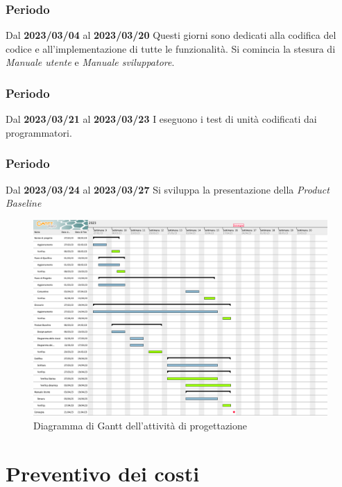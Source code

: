\subsubsection{ Periodo}
Dal \textbf{2023/03/04} al \textbf{2023/03/20}
\newline
Questi giorni sono dedicati alla codifica del codice e all'implementazione di tutte le funzionalità. Si comincia la stesura di 
\textit{Manuale utente} e \textit{Manuale sviluppatore}.
\subsubsection{ Periodo}
Dal \textbf{2023/03/21} al \textbf{2023/03/23}
\newline
I eseguono i test di unità codificati dai programmatori.
\subsubsection{ Periodo}
Dal \textbf{2023/03/24} al \textbf{2023/03/27}
\newline
Si sviluppa la presentazione della \textit{Product Baseline}

\begin{figure}[H]
    \centering
    \includegraphics[scale=0.32]{src/img/Gantt progettazione.png}
    \caption{Diagramma di Gantt dell'attività di progettazione}
\end{figure}


\section{Preventivo dei costi}

